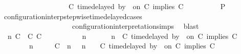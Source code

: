 \begin{isabellebody}
\ \ \ \ \ \ \ \ \ \ \ \ \ \ \ \ {\isasymturnstile}\ {\isasymPsi}\ {\isasymtriangleright}\ {\isacharparenleft}{\isacharparenleft}C\ time{\isacharminus}delayed\ by\ {\isasymdelta}{\isasymtau}\ on\ C\ implies\ C\ {\isacharhash}\ {\isasymPhi}{\isacharparenright}{\isacharparenright}{\isacartoucheclose}\isanewline
\ \ \ \ \ \ \isamarkupfalse%
\ {\isacharquery}P\ \isamarkupfalse%
\ configuration{\isacharunderscore}interp{\isacharunderscore}stepwise{\isacharunderscore}timedelayed{\isacharunderscore}cases\isanewline
\ \ \ \ \ \ \ \ \ \ \ \ \ \ \ \ \ \ \ \ configuration{\isacharunderscore}interpretation{\isachardot}simps\ \isamarkupfalse%
\ blast\isanewline
\ \ \ \ \isamarkupfalse%
\isanewline
\ \ \ \ \ \ \isamarkupfalse%
\ {\isasymGamma}\ n\ C\ {\isasymdelta}{\isasymtau}\ C\ C\ {\isasymPsi}\ {\isasymPhi}\isanewline
\ \ \ \ \ \ \isamarkupfalse%
\ {\isacartoucheopen}{\isacharparenleft}{\isasymGamma}\ n\ {\isasymturnstile}\ {\isasymPsi}\ {\isasymtriangleright}\ {\isasymPhi}\ {\isacharequal}\ {\isacharparenleft}{\isasymGamma}{\isacharcomma}\ n\ {\isasymturnstile}\ {\isacharparenleft}C\ time{\isacharminus}delayed{\isasymbowtie}\ by\ {\isasymdelta}{\isasymtau}\ on\ C\ implies\ C\ {\isacharhash}\ {\isasymPsi}\ {\isasymtriangleright}\ {\isasymPhi}{\isacharparenright}{\isacartoucheclose}\isanewline
\ \ \ \ \ \ \ {\isacartoucheopen}{\isacharparenleft}{\isasymGamma}\ n\ {\isasymturnstile}\ {\isasymPsi}\ {\isasymtriangleright}\ {\isasymPhi}\ {\isacharequal}\ {\isacharparenleft}{\isacharparenleft}{\isacharparenleft}C\ {\isasymnot}{\isasymUp}\ n{\isacharparenright}\ {\isacharhash}\ {\isasymGamma}{\isacharparenright}{\isacharcomma}\ n\ {\isasymturnstile}\ {\isasymPsi}\ {\isasymtriangleright}\ {\isacharparenleft}{\isacharparenleft}C\ time{\isacharminus}delayed{\isasymbowtie}\ by\ {\isasymdelta}{\isasymtau}\ on\ C\ implies\ C\ {\isacharhash}\ {\isasymPhi}{\isacharparenright}{\isacharparenright}{\isacartoucheclose}\isanewline

\end{isabellebody}

